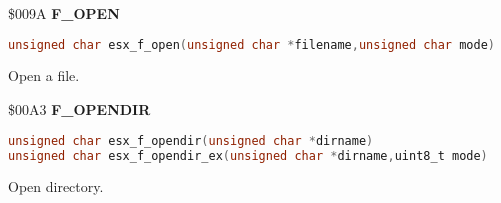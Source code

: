 \$009A \textbf{F\_OPEN}

\begin{lstlisting}[language=C]
unsigned char esx_f_open(unsigned char *filename,unsigned char mode)
\end{lstlisting}

Open a file.

%

\$00A3 \textbf{F\_OPENDIR}

\begin{lstlisting}[language=C]
unsigned char esx_f_opendir(unsigned char *dirname)
unsigned char esx_f_opendir_ex(unsigned char *dirname,uint8_t mode)
\end{lstlisting}

Open directory.


